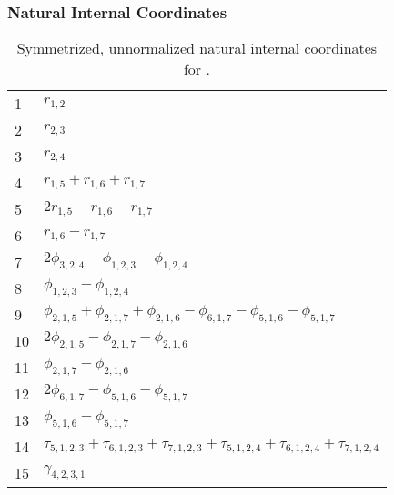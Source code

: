\documentclass[10pt,oneside]{article}
\begin{document}
\clearpage

\subsubsection*{Natural Internal Coordinates}
\begin{table}[h!]
\centering
\caption{Symmetrized, unnormalized natural internal coordinates for .}
\small
\begin{tabular}{ll}
  1   & $r_{1,2}$ \\
  2   & $r_{2,3}$ \\
  3   & $r_{2,4}$ \\
  4   & $r_{1,5} + r_{1,6} + r_{1,7}$ \\
  5   & $2r_{1,5} - r_{1,6} - r_{1,7}$ \\
  6   & $r_{1,6} - r_{1,7}$ \\
  7   & $2\phi_{3,2,4} - \phi_{1,2,3} - \phi_{1,2,4}$ \\
  8   & $\phi_{1,2,3} - \phi_{1,2,4}$ \\
  9   & $\phi_{2,1,5} + \phi_{2,1,7} + \phi_{2,1,6} - \phi_{6,1,7} - \phi_{5,1,6} - \phi_{5,1,7}$ \\
  10  & $2\phi_{2,1,5} - \phi_{2,1,7} - \phi_{2,1,6}$ \\
  11  & $\phi_{2,1,7} - \phi_{2,1,6}$ \\
  12  & $2\phi_{6,1,7} - \phi_{5,1,6} - \phi_{5,1,7}$ \\
  13  & $\phi_{5,1,6} - \phi_{5,1,7}$ \\
  14  & $\tau_{5,1,2,3} + \tau_{6,1,2,3} + \tau_{7,1,2,3} + \tau_{5,1,2,4} + \tau_{6,1,2,4} + \tau_{7,1,2,4}$ \\
  15  & $\gamma_{4,2,3,1}$ \\
\end{tabular}
\end{table}

\clearpage

\subsection{\ \ \ }
\end{document}
